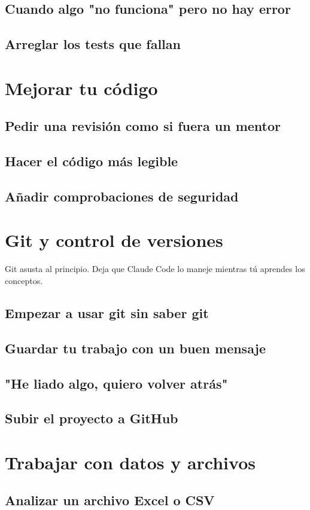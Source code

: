 \documentclass[11pt,a4paper]{book}
\begin{document}
\subsection{Cuando algo "no funciona" pero no hay error}
\subsection{Arreglar los tests que fallan}
\section{Mejorar tu código}
\subsection{Pedir una revisión como si fuera un mentor}
\subsection{Hacer el código más legible}
\subsection{Añadir comprobaciones de seguridad}
\section{Git y control de versiones}
Git asusta al principio. Deja que Claude Code lo maneje mientras tú aprendes los conceptos.

\subsection{Empezar a usar git sin saber git}
\subsection{Guardar tu trabajo con un buen mensaje}
\subsection{"He liado algo, quiero volver atrás"}
\subsection{Subir el proyecto a GitHub}
\section{Trabajar con datos y archivos}
\subsection{Analizar un archivo Excel o CSV}
\end{document}
